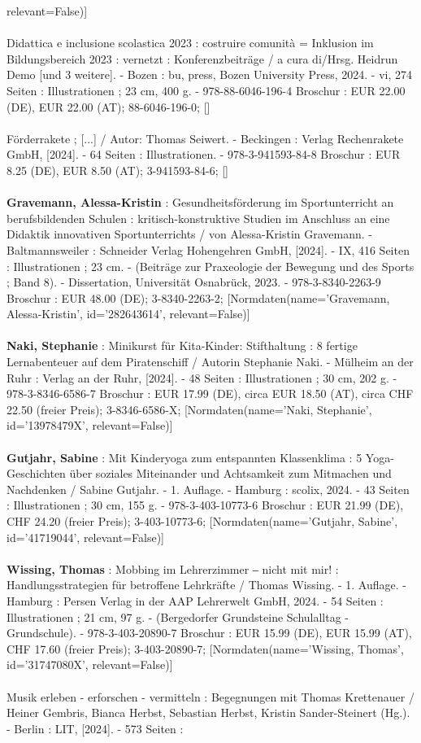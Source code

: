 \documentclass{article}
\begin{document}
\begin{multicols}{3}
relevant=False)]\\\\Didattica e inclusione scolastica 2023 : costruire comunità = Inklusion im Bildungsbereich 2023 : vernetzt : Konferenzbeiträge /  a cura di/Hrsg. Heidrun Demo [und 3 weitere]. - Bozen : bu, press, Bozen University Press, 2024. - vi, 274 Seiten : Illustrationen ; 23 cm, 400 g. - 978-88-6046-196-4 Broschur : EUR 22.00 (DE), EUR 22.00 (AT); 88-6046-196-0; []\\\\Förderrakete ; [...] / Autor: Thomas Seiwert. - Beckingen : Verlag Rechenrakete GmbH, [2024]. - 64 Seiten : Illustrationen. - 978-3-941593-84-8 Broschur : EUR 8.25 (DE), EUR 8.50 (AT); 3-941593-84-6; []\\\\\textbf{Gravemann, Alessa-Kristin} : Gesundheitsförderung im Sportunterricht an berufsbildenden Schulen : kritisch-konstruktive Studien im Anschluss an eine Didaktik innovativen Sportunterrichts / von Alessa-Kristin Gravemann. - Baltmannsweiler : Schneider Verlag Hohengehren GmbH, [2024]. - IX, 416 Seiten : Illustrationen ; 23 cm. - (Beiträge zur Praxeologie der Bewegung und des Sports ; Band 8). - Dissertation, Universität Osnabrück, 2023. - 978-3-8340-2263-9 Broschur : EUR 48.00 (DE); 3-8340-2263-2; [Normdaten(name='Gravemann, Alessa-Kristin', id='282643614', relevant=False)]\\\\\textbf{Naki, Stephanie} : Minikurst für Kita-Kinder: Stifthaltung : 8 fertige Lernabenteuer auf dem Piratenschiff  / Autorin Stephanie Naki. - Mülheim an der Ruhr : Verlag an der Ruhr, [2024]. - 48 Seiten : Illustrationen ; 30 cm, 202 g. - 978-3-8346-6586-7 Broschur : EUR 17.99 (DE), circa EUR 18.50 (AT), circa CHF 22.50 (freier Preis); 3-8346-6586-X; [Normdaten(name='Naki, Stephanie', id='13978479X', relevant=False)]\\\\\textbf{Gutjahr, Sabine} : Mit Kinderyoga zum entspannten Klassenklima : 5 Yoga-Geschichten über soziales Miteinander und Achtsamkeit zum Mitmachen und Nachdenken / Sabine Gutjahr. - 1. Auflage. - Hamburg : scolix, 2024. - 43 Seiten : Illustrationen ; 30 cm, 155 g. - 978-3-403-10773-6 Broschur : EUR 21.99 (DE), CHF 24.20 (freier Preis); 3-403-10773-6; [Normdaten(name='Gutjahr, Sabine', id='41719044', relevant=False)]\\\\\textbf{Wissing, Thomas} : Mobbing im Lehrerzimmer ‒ nicht mit mir! : Handlungsstrategien für betroffene Lehrkräfte / Thomas Wissing. - 1. Auflage. - Hamburg : Persen Verlag in der AAP Lehrerwelt GmbH, 2024. - 54 Seiten : Illustrationen ; 21 cm, 97 g. - (Bergedorfer Grundsteine Schulalltag - Grundschule). - 978-3-403-20890-7 Broschur : EUR 15.99 (DE), EUR 15.99 (AT), CHF 17.60 (freier Preis); 3-403-20890-7; [Normdaten(name='Wissing, Thomas', id='31747080X', relevant=False)]\\\\Musik erleben - erforschen - vermitteln : Begegnungen mit Thomas Krettenauer / Heiner Gembris, Bianca Herbst, Sebastian Herbst, Kristin Sander-Steinert (Hg.). - Berlin : LIT, [2024]. - 573 Seiten : 
\end{multicols}
\end{document}
